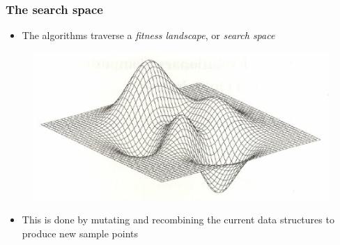 \documentclass{beamer}
\theoremstyle{plain}
\theoremstyle{definition}
\begin{document}
\begin{frame}
	\frametitle{The search space}
   \begin{itemize}
      \item The algorithms traverse a \textit{fitness
         landscape}, or \textit{search space}   
   \end{itemize}
   \begin{figure}[H]
      \centering
      \includegraphics[width=.6\textwidth]{landscape}
   \end{figure}
   \begin{itemize}
      \item This is done by mutating and recombining the current data structures
         to produce new sample points
   \end{itemize}
\end{frame}
\end{document}
